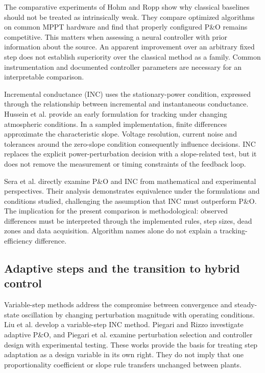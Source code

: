 The comparative experiments of Hohm and Ropp \cite{hohm} show why classical baselines should not be treated as intrinsically weak. They compare optimized algorithms on common MPPT hardware and find that properly configured P\&O remains competitive. This matters when assessing a neural controller with prior information about the source. An apparent improvement over an arbitrary fixed step does not establish superiority over the classical method as a family. Common instrumentation and documented controller parameters are necessary for an interpretable comparison.

Incremental conductance (INC) uses the stationary-power condition, expressed through the relationship between incremental and instantaneous conductance. Hussein et al. \cite{hussein} provide an early formulation for tracking under changing atmospheric conditions. In a sampled implementation, finite differences approximate the characteristic slope. Voltage resolution, current noise and tolerances around the zero-slope condition consequently influence decisions. INC replaces the explicit power-perturbation decision with a slope-related test, but it does not remove the measurement or timing constraints of the feedback loop.

Sera et al. \cite{sera} directly examine P\&O and INC from mathematical and experimental perspectives. Their analysis demonstrates equivalence under the formulations and conditions studied, challenging the assumption that INC must outperform P\&O. The implication for the present comparison is methodological: observed differences must be interpreted through the implemented rules, step sizes, dead zones and data acquisition. Algorithm names alone do not explain a tracking-efficiency difference.

\subsection{Adaptive steps and the transition to hybrid control}
Variable-step methods address the compromise between convergence and steady-state oscillation by changing perturbation magnitude with operating conditions. Liu et al. \cite{liu} develop a variable-step INC method. Piegari and Rizzo \cite{adaptive} investigate adaptive P\&O, and Piegari et al. \cite{adaptive2015} examine perturbation selection and controller design with experimental testing. These works provide the basis for treating step adaptation as a design variable in its own right. They do not imply that one proportionality coefficient or slope rule transfers unchanged between plants.

